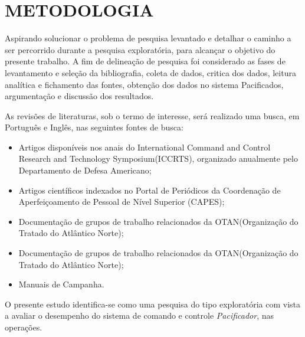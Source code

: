 \chapter{METODOLOGIA}
\label{chap:metodologia}

Aspirando solucionar o problema de pesquisa levantado e detalhar o caminho a ser percorrido durante a pesquisa exploratória, para alcançar o objetivo do presente trabalho. A fim de delineação de pesquisa foi considerado as fases de levantamento e seleção da bibliografia, coleta de dados, critica dos dados, leitura analítica e fichamento das fontes, obtenção dos dados no sistema Pacificados, argumentação e discussão dos resultados.

As revisões de literaturas, sob o termo de interesse, será realizado uma busca, em Português e Inglês, nas seguintes fontes de busca:
\begin{itemize}
    \item Artigos  disponíveis  nos  anais do International  Command  and  Control  Research and  Technology  Symposium(ICCRTS),  organizado  anualmente  pelo  Departamento  de Defesa Americano;
    \item Artigos  científicos  indexados  no  Portal  de  Periódicos  da  Coordenação  de Aperfeiçoamento de Pessoal de Nível Superior (CAPES);
    \item Documentação  de  grupos  de  trabalho  relacionados  da  OTAN(Organização  do Tratado do Atlântico Norte);
    \item Documentação  de  grupos  de  trabalho  relacionados  da  OTAN(Organização  do Tratado do Atlântico Norte);
    \item Manuais de Campanha.
\end{itemize}

O presente estudo identifica-se como uma pesquisa do tipo exploratória com vista a avaliar o desempenho do sistema de comando e controle \textit{Pacificador}, nas operações. 